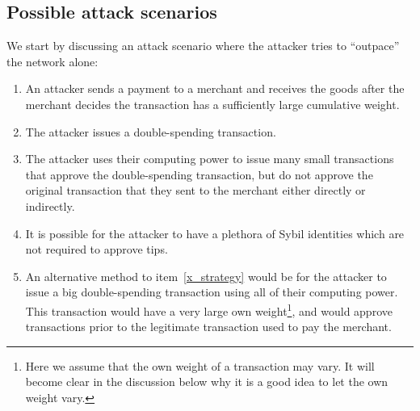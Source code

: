 \documentclass[12pt]{article}
\begin{document}
\begin{CJK}{UTF8}{bkai}
\section{Possible attack scenarios}
\label{s_attacks}
We start by discussing an 
attack scenario where the attacker tries to ``outpace'' the network alone:
\begin{enumerate}
 \item An attacker sends a payment to a merchant and receives 
 the goods after the merchant decides the transaction has a sufficiently large
  cumulative weight.
\item The attacker issues a double-spending transaction.
\item \label{x_strategy} The attacker uses their computing
 power to issue many small transactions that approve the
  double-spending transaction, but do not approve the 
  original transaction that they sent to the merchant either 
  directly or indirectly.
\item It is possible for the attacker to have a plethora of Sybil
 identities which are not required to approve tips.
\item An alternative method to item~\ref{x_strategy}
 would be for the attacker
 to issue a big double-spending transaction using all of their
  computing power. This transaction would have a very large
   own weight\footnote{Here we assume that the own weight 
   of a transaction may vary. It will become clear in the discussion
    below why it is a good idea to let the own weight vary.}, 
    and would approve transactions prior to the 
   legitimate transaction used to pay the merchant.

\end{enumerate}
\end{CJK}
\end{document}
